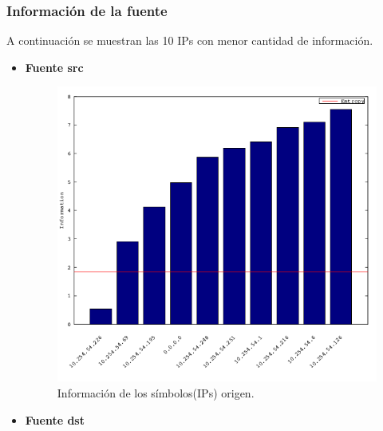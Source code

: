 \documentclass[10pt, a4paper]{article}
\begin{document}
\subsubsection{Información de la fuente}

A continuación se muestran las 10 IPs con menor cantidad de información.

\begin{itemize}
\item \textbf{Fuente src}

\begin{figure}[H] %
\begin{center}
\includegraphics[width=400pt]{../imgs/starbucks_src_chartbar.png}
\caption{Información de los símbolos(IPs) origen.}
\end{center}
\end{figure}


\item \textbf{Fuente dst}


\end{itemize}
\end{document}
